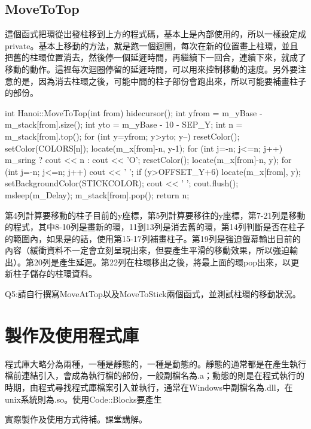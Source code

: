 \documentclass[12pt,a4paper]{article}
\begin{document}
\subsection{MoveToTop}
這個函式把環從出發柱移到上方的程式碼，基本上是內部使用的，所以一樣設定成private。基本上移動的方法，就是跑一個迴圈，每次在新的位置畫上柱環，並且把舊的柱環位置消去，然後停一個延遲時間，再繼續下一回合，連續下來，就成了移動的動作。這裡每次迴圈停留的延遲時間，可以用來控制移動的速度。另外要注意的是，因為消去柱環之後，可能中間的柱子部份會跑出來，所以可能要補畫柱子的部份。
\begin{cppcode}
int Hanoi::MoveToTop(int from)
{
	hidecursor();
	int yfrom = m_yBase - m_stack[from].size();
	int yto = m_yBase - 10 - SEP_Y;
	int n = m_stack[from].top();
	for (int y=yfrom; y>yto; y--) {
		resetColor(); setColor(COLORS[n]);
		locate(m_x[from]-n, y-1);
		for (int j=-n; j<=n; j++) m_sring ? cout << n : cout << 'O';
		resetColor();
		locate(m_x[from]-n, y);
		for (int j=-n; j<=n; j++) cout << ' ';
		if (y>OFFSET_Y+6) {
			locate(m_x[from], y);
			setBackgroundColor(STICKCOLOR);
			cout << ' ';
		}
		cout.flush();
		msleep(m_Delay);
	}
	m_stack[from].pop();
	return n;
}
\end{cppcode}
第4列計算要移動的柱子目前的y座標，第5列計算要移往的y座標，第7-21列是移動的程式，其中8-10列是畫新的環，11到13列是消去舊的環，第14列判斷是否在柱子的範圍內，如果是的話，使用第15-17列補畫柱子。第19列是強迫螢幕輸出目前的內容（緩衝資料不一定會立刻呈現出來，但要產生平滑的移動效果，所以強迫輸出）。第20列是產生延遲。第22列在柱環移出之後，將最上面的環pop出來，以更新柱子儲存的柱環資料。
	
Q5:請自行撰寫MoveAtTop以及MoveToStick兩個函式，並測試柱環的移動狀況。
\vspace{1cm}

\section{製作及使用程式庫}
程式庫大略分為兩種，一種是靜態的，一種是動態的。靜態的通常都是在產生執行檔前連結引入，會成為執行檔的部份，一般副檔名為.a；動態的則是在程式執行的時期，由程式尋找程式庫檔案引入並執行，通常在Windows中副檔名為.dll，在unix系統則為.so。使用Code::Blocks要產生

實際製作及使用方式待補。課堂講解。
\end{document}
